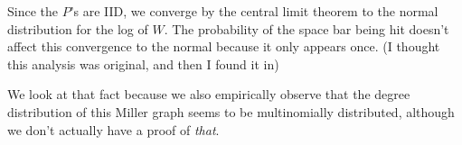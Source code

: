 \documentclass[12pt]{article}
\begin{document}
Since the $P$'s are IID, we converge by the central limit theorem to the normal distribution for the log of $W$. The probability of the space bar being hit doesn't affect this convergence to the normal because it only appears once. (I thought this analysis was original, and then I found it in) %

We look at that fact because we also empirically observe that the degree distribution of this Miller graph seems to be multinomially distributed, although we don't actually have a proof of \emph{that}.


\end{document}
